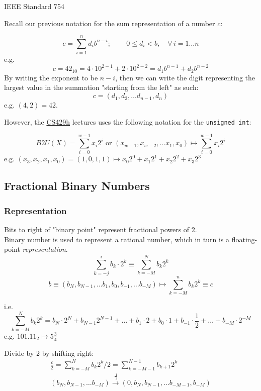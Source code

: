 \documentclass[10pt]{amsart}
\begin{document}
IEEE Standard 754

Recall our previous notation for the sum representation of a number $c$:

\begin{equation}
c = \sum_{i=1}^n d_i b^{n-i}; \qquad \, 0 \leq d_i < b , \quad \forall \, i = 1\dots n 
\end{equation}
e.g.
\[
c = 42_{10} = 4 \cdot 10^{2-1} + 2\cdot 10^{2-2} = d_1 b^{n-1} + d_2 b^{n-2}
\]
By writing the exponent to be $n-i$, then we can write the digit representing the largest value in the summation "starting from the left" as such: \\
\[
c = (d_1, d_2, \dots d_{n-1}, d_n)
\]
e.g. $(4, 2) = 42$.

However, the \href{https://www.cs.utexas.edu/users/fussell/courses/cs429h/lectures/Lecture_4-429h.pdf}{CS429h} lectures uses the following notation for the \texttt{unsigned int}:

\[
B2U(X) = \sum_{i=0}^{w-1} x_i 2^i \text{ or } (x_{w-1}, x_{w-2}, \dots x_1, x_0) \mapsto \sum_{i=0}^{w-1} x_i 2^i
\]
e.g. $(x_3, x_2, x_1, x_0) = (1, 0, 1, 1) \mapsto x_0 2^0 + x_1 2^1 + x_2 2^2 + x_3 2^3$

\subsection{Fractional Binary Numbers}

\subsubsection{Representation}

Bits to right of "binary point" represent fractional powers of 2. \\
Binary number is used to represent a rational number, which in turn is a floating-point \emph{representation}. 
\begin{equation}
\sum_{k=-j}^i b_k \cdot 2^k \equiv \sum_{k=-M}^N b_k 2^k
\end{equation}
\begin{equation}
b \equiv (b_N, b_{N-1}, \dots b_1, b_0, b_{-1}, \dots b_{-M}) \mapsto \sum_{k=-M}^n b_k 2^k \equiv c
\end{equation}

i.e. 
\[
\sum_{k=-M}^N b_k 2^k = b_N \cdot 2^N + b_{N-1} 2^{N-1} + \dots + b_1 \cdot 2 + b_0 \cdot 1 + b_{-1} \cdot \frac{1}{2} + \dots + b_{-M} \cdot 2^{-M}
\]
e.g. $101.11_2 \mapsto 5 \frac{3}{4} $ 

Divide by 2 by shifting right: 
\begin{equation}
\begin{gathered} 
\frac{c}{2} = \sum_{k=-M}^N b_k 2^k/2 = \sum_{k=-M-1}^{N-1} b_{k+1} 2^k \\	
(b_N, b_{N-1}, \dots b_{-M}) \xrightarrow{ \cdot \frac{1}{2}} (0, b_N, b_{N-1}, \dots b_{-M-1}, b_{-M})
\end{gathered} 
\end{equation}
\end{document}
